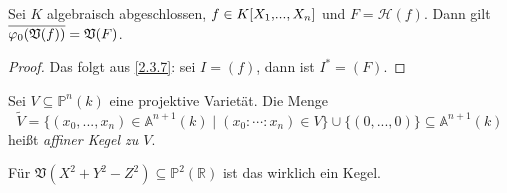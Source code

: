 \documentclass[a4paper,12pt,index=toc]{scrbook}
\theoremstyle{keinenummern} %
\def\A{\mathbb{A}}
\def\V{\mathfrak{V}}
\def\P{\mathbb{P}}
\renewcommand{\H}{\mathcal{H}} %
\renewcommand{\phi}{\varphi}
\renewcommand{\dotsc}{\ensuremath{\!...}}
\newcommand{\schlange}[1]{\widetilde{#1}}
\newcommand{\set}[1]{\ensuremath{\mathbb{#1}}}
\newcommand{\R}{\set{R}}
\def\Bar#1{\ensuremath\overline{#1}}
\newcommand{\polyx}[1][n]{\ensuremath%
  [X_{1},\dotsc,X_{#1}]}
\begin{document}
\begin{kor}\label{2.3.12}
  Sei $K$ algebraisch abgeschlossen, $f\in K\polyx$ und $F=\H(f)$. Dann gilt $\Bar{\phi_0(\V(f))}=\V(F)$.
\end{kor}
\begin{proof}
  Das folgt aus \cref{2.3.7}: sei $I=(f)$, dann ist $I^*=(F)$.
\end{proof}


\begin{dfn}\label{2.3.11dfn}
  Sei $V\subseteq\P^n(k)$ eine projektive Varietät. Die Menge
  \begin{equation*} \schlange{V}=\{(x_0,\dotsc,x_n)\in\A^{n+1}(k)\mid(x_0:\dotsm:x_n)\in V\}\cup\{(0,\dotsc,0)\} \subseteq\A^{n+1}(k) \end{equation*}
  heißt \emph{affiner Kegel zu $V$}.
\end{dfn}

\begin{nbsp}
  Für $\V(X^2+Y^2-Z^2)\subseteq\P^2(\R)$ ist das wirklich ein Kegel.
\end{nbsp}
\end{document}
